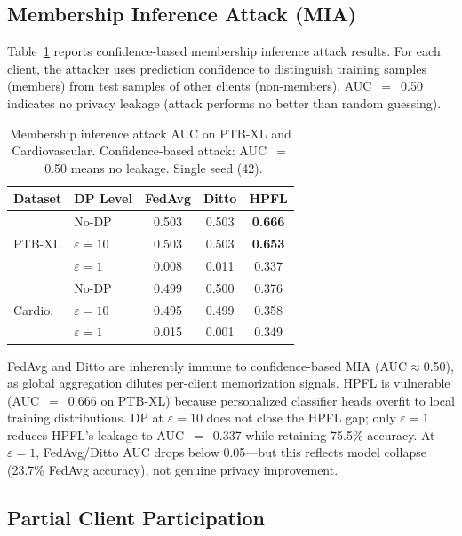 \documentclass[conference,a4paper]{IEEEtran}
\begin{document}
\subsection{Membership Inference Attack (MIA)}
\label{sec:mia}

Table~\ref{tab:mia_results} reports confidence-based membership inference attack results. For each client, the attacker uses prediction confidence to distinguish training samples (members) from test samples of other clients (non-members). AUC~$=$~0.50 indicates no privacy leakage (attack performs no better than random guessing).

\begin{table}[htbp]
\centering
\caption{Membership inference attack AUC on PTB-XL and Cardiovascular. Confidence-based attack: AUC~$=$~0.50 means no leakage. Single seed (42).}
\label{tab:mia_results}
\small
\begin{tabular}{llccc}
\toprule
\textbf{Dataset} & \textbf{DP Level} & \textbf{FedAvg} & \textbf{Ditto} & \textbf{HPFL} \\
\midrule
\multirow{3}{*}{PTB-XL} & No-DP & 0.503 & 0.503 & \textbf{0.666} \\
 & $\varepsilon{=}10$ & 0.503 & 0.503 & \textbf{0.653} \\
 & $\varepsilon{=}1$ & 0.008 & 0.011 & 0.337 \\
\midrule
\multirow{3}{*}{Cardio.} & No-DP & 0.499 & 0.500 & 0.376 \\
 & $\varepsilon{=}10$ & 0.495 & 0.499 & 0.358 \\
 & $\varepsilon{=}1$ & 0.015 & 0.001 & 0.349 \\
\bottomrule
\end{tabular}

\vspace{1mm}
\footnotesize{FedAvg and Ditto are inherently immune to confidence-based MIA (AUC$\approx$0.50), as global aggregation dilutes per-client memorization signals. HPFL is vulnerable (AUC~$=$~0.666 on PTB-XL) because personalized classifier heads overfit to local training distributions. DP at $\varepsilon{=}10$ does not close the HPFL gap; only $\varepsilon{=}1$ reduces HPFL's leakage to AUC~$=$~0.337 while retaining 75.5\% accuracy. At $\varepsilon{=}1$, FedAvg/Ditto AUC drops below 0.05---but this reflects model collapse (23.7\% FedAvg accuracy), not genuine privacy improvement.}
\end{table}

\subsection{Partial Client Participation}
\label{sec:partial_participation}
\end{document}
